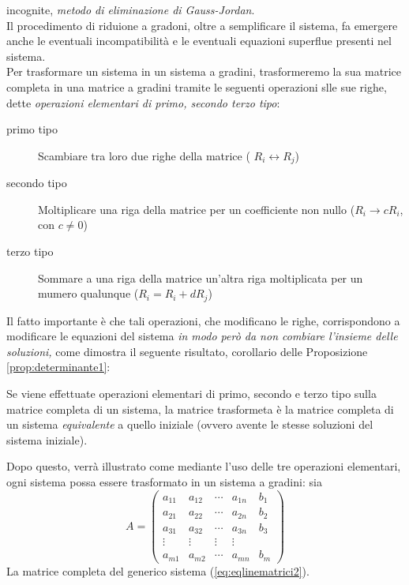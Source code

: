 incognite, \textit{metodo di eliminazione di Gauss-Jordan}.\\
Il procedimento di riduione a gradoni, oltre a semplificare il sistema, fa
emergere anche le eventuali incompatibilità e le eventuali equazioni
superflue presenti nel sistema.\\
Per trasformare un sistema in un sistema a gradini, trasformeremo la sua
matrice completa in una matrice a gradini tramite le seguenti operazioni
slle sue righe, dette \textit{operazioni elementari di primo, secondo
  terzo tipo}:
\begin{description}
\item[primo tipo] Scambiare tra loro due righe della matrice (
  $R_i \leftrightarrow R_j$)
\item[secondo tipo] Moltiplicare una riga della matrice per un
  coefficiente non nullo ($R_i\to cR_i$, con $c\neq 0$)
\item[terzo tipo] Sommare a una riga della matrice un'altra riga
  moltiplicata per un mumero qualunque ($R_i=R_i+dR_j$)
\end{description}
Il fatto importante è che tali operazioni, che modificano le righe,
corrispondono a modificare le equazioni del sistema \textit{in modo però
  da non combiare l'insieme delle soluzioni,} come dimostra il seguente
risultato, corollario delle Proposizione \ref{prop:determinante1}:
\begin{prop}
  \label{prop:determinante2}
  Se viene effettuate operazioni elementari di primo, secondo e terzo
  tipo sulla matrice completa di un sistema, la matrice trasformeta è la
  matrice completa di un sistema \textit{equivalente} a quello iniziale
  (ovvero avente le stesse soluzioni del sistema iniziale).
\end{prop}
Dopo questo, verrà illustrato come mediante l'uso delle tre operazioni
elementari, ogni sistema possa essere trasformato in un sistema a gradini:
sia
\begin{equation}
  \label{eq:gauss-jorda4}
  A=
  \begin{pmatrix}
    a_{11} & a_{12} & \cdots & a_{1n} & b_1\\
    a_{21} & a_{22} & \cdots & a_{2n} & b_2\\
    a_{31} & a_{32} & \cdots & a_{3n} & b_3\\
    \vdots & \vdots & \vdots & \vdots\\
    a_{m1} & a_{m2} & \cdots & a_{mn} & b_m
  \end{pmatrix}
\end{equation}
La matrice completa del generico sistema (\ref{eq:eqlinematrici2}).\\
